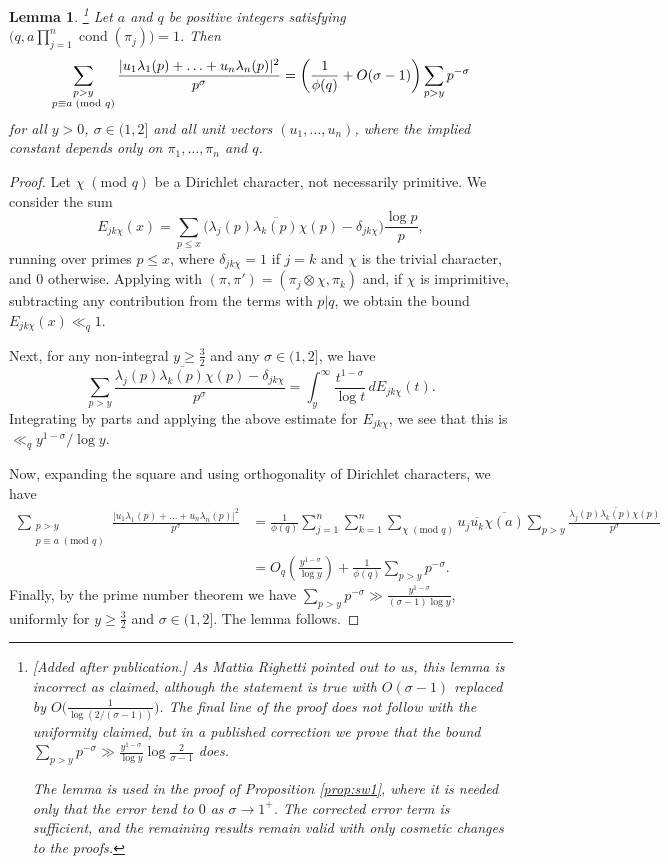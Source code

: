 \documentclass[11pt]{amsart}
\newtheorem{lemma}[theorem]{Lemma}
\theoremstyle{remark}
\numberwithin{theorem}{section}
\numberwithin{equation}{section}
\DeclareMathOperator{\cond}{cond}
\begin{document}
\begin{lemma}\label{lem:sump}\footnote{[Added after publication.] As Mattia Righetti pointed out to us, this lemma is incorrect
as claimed, although the statement is true with $O(\sigma - 1)$ replaced by $O\big( \frac{1}{\log(2/(\sigma - 1))}\big)$. The final
line of the proof does not follow with the uniformity claimed, but in a published correction we prove that the bound
$\sum_{p > y} p^{-\sigma} \gg \frac{y^{1 - \sigma}}{\log y} \log \frac{2}{\sigma - 1}$ does.

The lemma is used in the proof of Proposition \ref{prop:sw1}, where it is needed only that the error tend to $0$
as $\sigma \rightarrow 1^+$. The corrected error term is sufficient, and the remaining results remain valid with only
cosmetic changes to the proofs.}
Let $a$ and $q$ be positive integers satisfying
$\bigl(q,a\prod_{j=1}^n\cond(\pi_j)\bigr)=1$.
Then
\[
\sum_{\substack{p>y\\p\equiv{a}\;(\text{\rm mod }q)}}
\frac{|u_1\lambda_1(p)+\ldots+u_n \lambda_n(p)|^2}{p^\sigma} = 
\bigg( \frac{1}{ \phi(q)} + O(\sigma-1)\bigg)
\sum_{p>y}p^{-\sigma}
\]
for all $y>0$, $\sigma\in(1,2]$ and all unit vectors
$(u_1, \ldots, u_n)$, where the implied constant
depends only on $\pi_1,\ldots,\pi_n$ and $q$.
\end{lemma}
\begin{proof}
Let $\chi\;(\text{mod }q)$ be a Dirichlet character, not necessarily primitive.
We consider the sum
\[
E_{jk\chi}(x)=
\sum_{p\le x}\big(\lambda_j(p)\overline{\lambda_k(p)}\chi(p)
-\delta_{jk\chi}\big)\frac{\log{p}}{p},
\]
running over primes $p\le x$,
where $\delta_{jk\chi}=1$ if $j=k$ and $\chi$ is the trivial
character, and $0$ otherwise.  Applying \cite[(2) and (3)]{as} with
$(\pi,\pi')=(\pi_j\otimes\chi,\pi_k)$ and, if $\chi$ is imprimitive,
subtracting any contribution from the terms with $p|q$,
we obtain the bound $E_{jk\chi}(x)\ll_q 1$.

Next, for any non-integral $y\ge\frac32$ and any $\sigma\in(1,2]$, we have
$$
\sum_{p>y}
\frac{\lambda_j(p)\overline{\lambda_k(p)}\chi(p)-\delta_{jk\chi}}{p^\sigma}
=\int_y^\infty\frac{t^{1-\sigma}}{\log{t}}\,dE_{jk\chi}(t).
$$
Integrating by parts and applying the above estimate for
$E_{jk\chi}$, we see that this is $\ll_q y^{1-\sigma}/\log{y}$.

Now, expanding the square and using orthogonality of Dirichlet
characters, we have
$$
\begin{aligned}
\sum_{\substack{p>y\\p\equiv{a}\;(\text{mod }q)}}
\frac{|u_1\lambda_1(p)+\ldots+u_n\lambda_n(p)|^2}{p^\sigma}&=
\frac1{\phi(q)}\sum_{j=1}^n\sum_{k=1}^n
\sum_{\chi\;(\text{mod }q)}u_j\overline{u_k}\overline{\chi(a)}
\sum_{p>y}\frac{\lambda_j(p)\overline{\lambda_k(p)}\chi(p)}{p^\sigma}\\
&=O_q\!\left(\frac{y^{1-\sigma}}{\log{y}}\right)
+\frac1{\phi(q)}\sum_{p>y}p^{-\sigma}.
\end{aligned}
$$
Finally, by the prime number theorem we have
$\sum_{p>y}p^{-\sigma}\gg\frac{y^{1-\sigma}}{(\sigma-1)\log{y}}$,
uniformly for $y\ge\frac32$ and $\sigma\in(1,2]$.
The lemma follows.
\end{proof}
\end{document}
